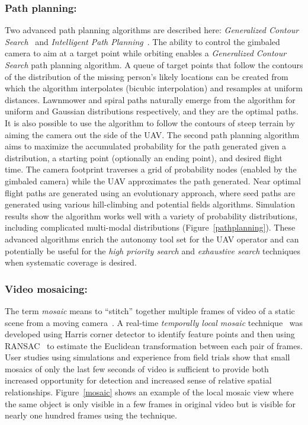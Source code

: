 \documentclass[letterpaper]{article}
\begin{document}
\subsubsection{Path planning:}
Two advanced path planning algorithms are described here: \textit{Generalized Contour Search}~\cite{goodrich2008supporting} and \textit{Intelligent Path Planning}~\cite{lin2009IROS}. The ability to control the gimbaled camera to aim at a target point while orbiting enables a \textit{Generalized Contour Search} path planning algorithm. A queue of target points that follow the contours of the distribution of the missing person's likely locations can be created from which the algorithm interpolates (bicubic interpolation) and resamples at uniform distances. Lawnmower and spiral paths naturally emerge from the algorithm for uniform and Gaussian distributions respectively, and they are the optimal paths. It is also possible to use the algorithm to follow the contours of steep terrain by aiming the camera out the side of the UAV. The second path planning algorithm aims to maximize the accumulated probability for the path generated given a distribution, a starting point (optionally an ending point), and desired flight time. The camera footprint traverses a grid of probability nodes (enabled by the gimbaled camera) while the UAV approximates the path generated. Near optimal flight paths are generated using an evolutionary approach, where seed paths are generated using various hill-climbing and potential fields algorithms. Simulation results show the algorithm works well with a variety of probability distributions, including complicated multi-modal distributions (Figure~\ref{pathplanning}). These advanced algorithms enrich the autonomy tool set for the UAV operator and can potentially be useful for the \textit{high priority search} and \textit{exhaustive search} techniques when systematic coverage is desired.


\subsubsection{Video mosaicing:}
The term \textit{mosaic} means to ``stitch'' together multiple frames of video of a static scene from a moving camera~\cite{szeliski2006mosaic}. A real-time \textit{temporally local mosaic} technique~\cite{morse2008mosaics} was developed using Harris corner detector to identify feature points and then using RANSAC~\cite{fischler1981random} to estimate the Euclidean transformation between each pair of frames. User studies using simulations and experience from field trials show that small mosaics of only the last few seconds of video is sufficient to provide both increased opportunity for detection and increased sense of relative spatial relationships. Figure~\ref{mosaic} shows an example of the local mosaic view where the same object is only visible in a few frames in original video but is visible for nearly one hundred frames using the technique.
\end{document}
